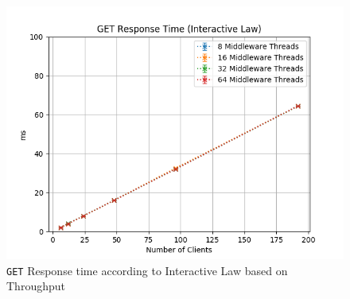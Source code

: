 \documentclass[11pt,a4paper]{article}
\begin{document}
%
\begin{figure}[H]
	\centering
    \begin{minipage}{0.5\textwidth}
        \includegraphics[width=\textwidth]{../illustrations/plots/2_1_one_middleware/0-1/middleware_interactive_get_rt_ms.png}
        \caption{\texttt{GET} Response time according to Interactive Law based on Throughput}
        \label{fig:one_middleware_get_rt_it}
    \end{minipage}\hfill
\end{figure}
%
\end{document}
